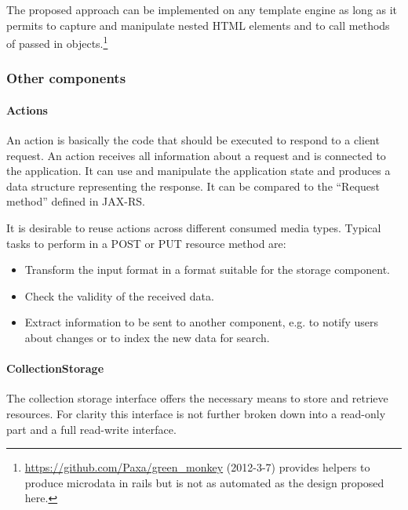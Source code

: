 \documentclass[12pt,a4paper,twoside]{scrartcl}		%
\newcommand{\citeurl}[2]{\url{#1} (#2)}
\begin{document}
The proposed approach can be implemented on any template engine as long as it
permits to capture and manipulate nested HTML elements and to call methods of
passed in
objects.\footnote{\citeurl{https://github.com/Paxa/green_monkey}{2012-3-7}
  provides helpers to produce microdata in rails but is not as automated as the
  design proposed here.}

\subsubsection{Other components}

\paragraph{Actions}
\label{sec:components-actions}

An action is basically the code that should be executed to respond to a client
request. An action receives all information about a request and is connected to
the application. It can use and manipulate the application state and produces a
data structure representing the response. It can be compared to the ``Request
method'' defined in JAX-RS.


It is desirable to reuse actions across different consumed media types. Typical
tasks to perform in a POST or PUT resource method are:
\begin{itemize}
\item Transform the input format in a format suitable for the storage component.
\item Check the validity of the received data.
\item Extract information to be sent to another component, e.g. to notify users
  about changes or to index the new data for search.
\end{itemize}

\paragraph{CollectionStorage}
\label{sec:collectionstorage}

The collection storage interface offers the necessary means to store and
retrieve resources. For clarity this interface is not further broken down into a
read-only part and a full read-write interface.
\end{document}
